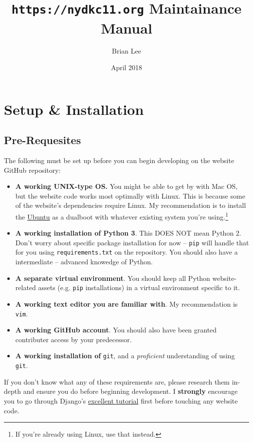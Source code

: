 \documentclass[hidelinks]{article}
\title{\texttt{https://nydkc11.org} Maintainance Manual}
\author{Brian Lee}
\date{April 2018}
\begin{document}
\maketitle

\section{Setup \& Installation}

\subsection{Pre-Requesites}

The following must be set up before you can begin developing on the website GitHub repository:

\begin{itemize}
\item \textbf{A working UNIX-type OS.} You might be able to get by with Mac OS, but the website code works most optimally with Linux. 
This is because some of the website's dependencies require Linux.
My recommendation is to install the \href{https://www.ubuntu.com/}{Ubuntu} as a dualboot with whatever existing system you're using.\footnote{If you're already using Linux, use that instead.}
\item \textbf{A working installation of Python 3}. This DOES NOT mean Python 2. Don't worry about specific package installation for now -- \texttt{pip} will handle that for you using \texttt{requirements.txt} on the repository.
You should also have a intermediate -- advanced knowedge of Python.
\item \textbf{A separate virtual environment}. You should keep all Python website-related assets (e.g. \texttt{pip} installations) in a virtual environment specific to it.
\item \textbf{A working text editor you are familiar with}. My recommendation is \texttt{vim}.
\item \textbf{A working GitHub account}. You should also have been granted contributer access by your predecessor.
\item \textbf{A working installation of} \texttt{git}, and a \textit{proficient} understanding of using \texttt{git}.
\end{itemize}

If you don't know what any of these requirements are, please research them in-depth and ensure you do before beginning development.
I \textbf{strongly} encourage you to go through Django's \href{https://docs.djangoproject.com/en/1.11/intro/tutorial01/}{excellent tutorial} first before touching any website code.
\end{document}
